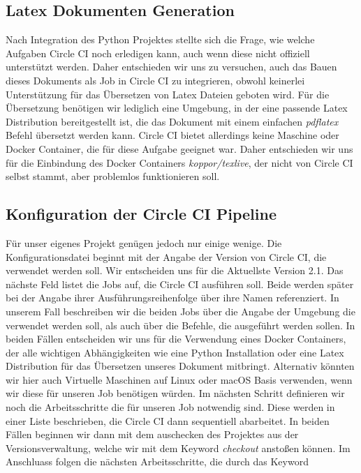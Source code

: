 \documentclass[11pt]{article}
\begin{document}
\subsection{Latex Dokumenten Generation}

Nach Integration des Python Projektes stellte sich die Frage, wie welche Aufgaben Circle CI noch erledigen kann, auch wenn diese nicht offiziell unterstützt werden. Daher entschieden wir uns zu versuchen, auch das Bauen dieses Dokuments als Job in Circle CI zu integrieren, obwohl keinerlei Unterstützung für das Übersetzen von Latex Dateien geboten wird. Für die Übersetzung benötigen wir lediglich eine Umgebung, in der eine passende Latex Distribution bereitgestellt ist, die das Dokument mit einem einfachen \textit{pdflatex} Befehl übersetzt werden kann. Circle CI bietet allerdings keine Maschine oder Docker Container, die für diese Aufgabe geeignet war. Daher entschieden wir uns für die Einbindung des Docker Containers \textit{koppor/texlive}, der nicht von Circle CI selbst stammt, aber problemlos funktionieren soll.

\subsection{Konfiguration der Circle CI Pipeline}
Für unser eigenes Projekt genügen jedoch nur einige wenige. Die Konfigurationsdatei beginnt mit der Angabe der Version von Circle CI, die verwendet werden soll. Wir entscheiden uns für die Aktuellste Version 2.1. Das nächste Feld listet die Jobs auf, die Circle CI ausführen soll. Beide werden später bei der Angabe ihrer Ausführungsreihenfolge über ihre Namen referenziert. In unserem Fall beschreiben wir die beiden Jobs über die Angabe der Umgebung die verwendet werden soll, als auch über die Befehle, die ausgeführt werden sollen. In beiden Fällen entscheiden wir uns für die Verwendung eines Docker Containers, der alle wichtigen Abhängigkeiten wie eine Python Installation oder eine Latex Distribution für das Übersetzen unseres Dokument mitbringt. Alternativ könnten wir hier auch Virtuelle Maschinen auf Linux oder macOS Basis verwenden, wenn wir diese für unseren Job benötigen würden.
Im nächsten Schritt definieren wir noch die Arbeitsschritte die für unseren Job notwendig sind. Diese werden in einer Liste beschrieben, die Circle CI dann sequentiell abarbeitet. In beiden Fällen beginnen wir dann mit dem auschecken des Projektes aus der Versionsverwaltung, welche wir mit dem Keyword \textit{checkout} anstoßen können. Im Anschluass folgen die nächsten Arbeitsschritte, die durch das Keyword 
\end{document}
